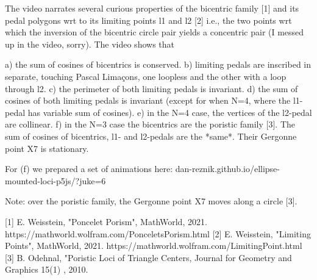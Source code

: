 The video narrates several curious properties of the bicentric family [1] and its pedal polygons wrt to its limiting points l1 and l2 [2] i.e., the two points wrt which the inversion of the bicentric circle pair yields a concentric pair (I messed up in the video, sorry). The video shows that

a) the sum of cosines of bicentrics is conserved.
b) limiting pedals are inscribed in separate, touching Pascal Limaçons, one loopless and the other with a loop through l2.
c) the perimeter of both limiting pedals is invariant.
d) the sum of cosines of both limiting pedals is invariant (except for when N=4, where the l1-pedal has variable sum of cosines).
e) in the N=4 case,  the vertices of the l2-pedal are collinear.
f) in the N=3 case the bicentrics are the poristic family [3]. The sum of cosines of bicentrics, l1- and l2-pedals are the *same*. Their Gergonne point X7 is stationary.

For (f) we prepared a set of animations here: dan-reznik.github.io/ellipse-mounted-loci-p5js/?juke=6

Note: over the poristic family, the Gergonne point X7 moves along a circle [3].

[1] E. Weisstein, "Poncelet Porism", MathWorld, 2021. https://mathworld.wolfram.com/PonceletsPorism.html
[2] E. Weisstein, "Limiting Points", MathWorld, 2021. https://mathworld.wolfram.com/LimitingPoint.html
[3] B. Odehnal, "Poristic Loci of Triangle Centers, Journal for Geometry and Graphics 15(1) , 2010.
